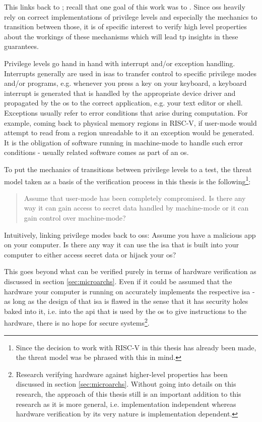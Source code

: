 This links back to \cite{Reid17}; recall that one goal of this work was to .
Since \glspl{os} heavily rely on correct implementations of privilege levels and especially the mechanics to transition between those, it is of specific interest to verify high level properties about the workings of these mechanisms which will lead tp insights in these guarantees.

Privilege levels go hand in hand with interrupt and/or exception handling.
Interrupts generally are used in \glspl{isa} to transfer control to specific privilege modes and/or programs, e.g. whenever you press a key on your keyboard, a keyboard interrupt is generated that is handled by the appropriate device driver and propagated by the \gls{os} to the correct application, e.g. your text editor or shell.
Exceptions usually refer to error conditions that arise during computation.
For example, coming back to physical memory regions in RISC-V, if user-mode would attempt to read from a region unreadable to it an exception would be generated.
It is the obligation of software running in machine-mode to handle such error conditions - usually related software comes as part of an \gls{os}.

To put the mechanics of transitions between privilege levels to a test, the threat model taken as a basis of the verification process in this thesis is the following\footnote{%
    Since the decision to work with RISC-V in this thesis has already been made, the threat model was be phrased with this in mind.
}:
\begin{quote}
    Assume that user-mode has been completely compromised.
    Is there any way it can gain access to secret data handled by machine-mode or it can gain control over machine-mode?
\end{quote}

Intuitively, linking privilege modes back to \glspl{os}: Assume you have a malicious app on your computer.
Is there any way it can use the \gls{isa} that is built into your computer to either access secret data or hijack your \gls{os}?

This goes beyond what can be verified purely in terms of hardware verification as discussed in section \ref{sec:microarchs}.
Even if it could be assumed that the hardware your computer is running on accurately implements the respective \gls{isa} - as long as the design of that \gls{isa} is flawed in the sense that it has security holes baked into it, i.e. into the \gls{api} that is used by the \gls{os} to give instructions to the hardware, there is no hope for secure systems\footnote{%
    Research verifying hardware against higher-level properties has been discussed in section \ref{sec:microarchs}.
    Without going into details on this research, the approach of this thesis still is an important addition to this research as it is more general, i.e. implementation independent whereas hardware verification by its very nature is implementation dependent.
}.

